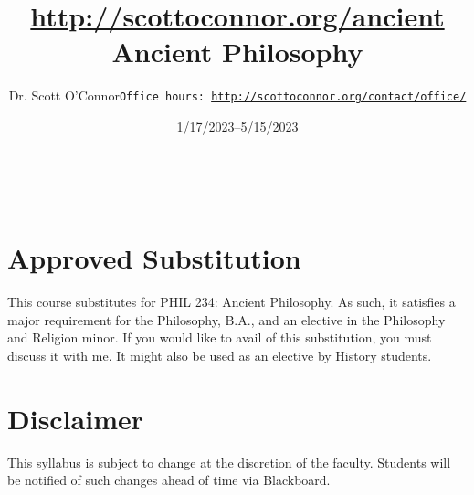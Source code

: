 \documentclass[article,oneside]{memoir}
\def\myauthor{Author}
\def\mytitle{Title}
\def\mycopyright{\myauthor}
\def\myweb{\href{http://scottoconnor.org/ancient}{http://scottoconnor.org/ancient}}
\def\myauthor{Dr. Scott O'Connor}
\def\mytitle{{\normalsize \myweb \newline} \HUGE Ancient Philosophy}
\begin{document}
\setsansfont[Mapping=tex-text]{Myriad Pro} 
\setmonofont[Mapping=tex-text,Scale=0.8]{Georgia} 

\def\ind{\hangindent=1 true cm\hangafter=1 \noindent}
\def\labelitemi{$\cdot$}


\title{\LARGE \mytitle}     
\author{\Large\myauthor \newline \footnotesize\texttt{\noindent Office hours: \href{http://scottoconnor.org/contact/office/}{http://scottoconnor.org/contact/office/}}}
\date{1/17/2023--5/15/2023}
\\


\maketitle




%
%

\section{Approved Substitution}

This course substitutes for PHIL 234: Ancient Philosophy. As such, it satisfies a major requirement for the Philosophy, B.A., and an elective in the Philosophy and Religion minor. If you would like to avail of this substitution, you must discuss it with me. It might also be used as an elective by History students. 

\section{Disclaimer}
 This syllabus is subject to change at the discretion of the faculty. Students will be notified of such changes ahead of time via Blackboard. 
\end{document}
